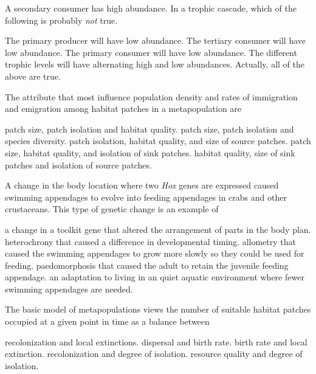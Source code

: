 \question
A secondary consumer has high abundance. In a trophic cascade, which of the following is probably \emph{not} true.
\begin{choices}
\correctchoice The primary producer will have low abundance. %
\choice The tertiary consumer will have low abundance. %
\choice The primary consumer will have low abundance. %
\choice The different trophic levels will have alternating high and low abundances. %
\choice Actually, all of the above are true. %
\end{choices}

\question
The attribute that most influence population density and rates of immigration and emigration among habitat patches in a metapopulation are

\begin{choices}
\correctchoice patch size, patch isolation and habitat quality. %
\choice patch size, patch isolation and species diversity. %
\choice patch isolation, habitat quality, and size of source patches. %
\choice patch size, habitat quality, and isolation of sink patches. %
\choice habitat quality, size of sink patches and isolation of source patches. %
\end{choices}

\question
A change in the body location where two \textit{Hox} genes are expressed caused swimming appendages to evolve into feeding appendages in crabs and other crustaceans. This type of genetic change is an example of

\begin{choices}
\correctchoice a change in a toolkit gene that altered the arrangement of parts in the body plan. %
\choice heterochrony that caused a difference in developmental timing. %
\choice allometry that caused the swimming appendages to grow more slowly so they could be used for feeding. %
\choice paedomorphosis that caused the adult to retain the juvenile feeding appendage. %
\choice an adaptation to living in an quiet aquatic environment where fewer swimming appendages are needed. %
\end{choices}


\question
The basic model of metapopulations views the number of suitable habitat patches occupied at a given point in time as a balance between

\begin{choices}
\correctchoice recolonization and local extinctions. %
\choice dispersal and birth rate. %
\choice birth rate and local extinction. %
\choice recolonization and degree of isolation. %
\choice resource quality and degree of isolation. %
\end{choices}

